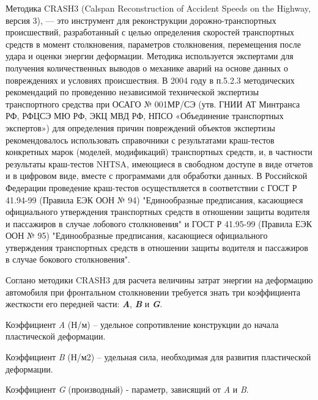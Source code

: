 	Методика {CRASH3} (Calspan Reconstruction of Accident Speeds on the Highway, версия 3), \cite{crash3} — это инструмент для реконструкции дорожно-транспортных происшествий, разработанный с целью определения скоростей транспортных средств в момент столкновения, параметров столкновения, перемещения после удара и оценки энергии деформации.  Методика  используется экспертами для получения количественных выводов о механике аварий на основе данных о повреждениях и условиях происшествия.  В 2004 году в п.5.2.3 методических рекомендаций по проведению независимой технической экспертизы транспортного средства при ОСАГО № 001МР/СЭ (утв. ГНИИ АТ Минтранса РФ, РФЦСЭ МЮ РФ, ЭКЦ МВД РФ, НПСО «Объединение транспортных экспертов») для  определения причин повреждений объектов экспертизы рекомендовалось использовать справочники с  результатами краш-тестов конкретных марок (моделей, модификаций) транспортных  средств, и, в частности результаты краш-тестов NHTSA, имеющиеся в свободном доступе в виде отчетов и в цифровом виде, вместе с программами для обработки данных.  В Российской Федерации проведение краш-тестов осуществляется в соответствии с ГОСТ Р 41.94-99 (Правила
	ЕЭК ООН № 94) "Единообразные предписания, касающиеся официального утверждения транспортных средств в отношении защиты водителя и пассажиров в случае лобового столкновения" и ГОСТ Р 41.95-99 (Правила ЕЭК ООН № 95) "Единообразные предписания, касающиеся официального утверждения транспортных средств в отношении защиты водителя и пассажиров в случае бокового столкновения". 
	
	
	
	
   
Соглано методики CRASH3 для расчета величины затрат энергии на деформацию автомобиля при   фронтальном столкновении требуется знать три коэффициента жесткости его передней  части: \textbf{\textit{ A}},  \textbf{\textit{B}} и \textbf{\textit{G}}.

Коэффициент \textit{A} (Н/м)
 -- удельное сопротивление конструкции до начала пластической деформации.    
 
 Коэффициент \textit{B} (Н/м2) -- удельная сила, необходимая для развития пластической деформации.
 
  Коэффициент \textit{G} (производный) - параметр, зависящий от \textit{A} и \textit{B}.
  

